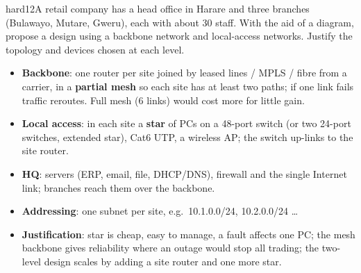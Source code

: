 \documentclass[10pt]{article}
\begin{document}
\begin{practice}{hard}{12}A retail company has a head office in Harare and three branches (Bulawayo, Mutare, Gweru), each with about 30 staff. With the aid of a diagram, propose a design using a backbone network and local-access networks. Justify the topology and devices chosen at each level.
\sol
\begin{center}
\end{center}
\begin{itemize}
\item \textbf{Backbone}: one router per site joined by leased lines / MPLS / fibre from a carrier, in a \textbf{partial mesh} so each site has at least two paths; if one link fails traffic reroutes. Full mesh (6 links) would cost more for little gain.
\item \textbf{Local access}: in each site a \textbf{star} of PCs on a 48-port switch (or two 24-port switches, extended star), Cat6 UTP, a wireless AP; the switch up-links to the site router.
\item \textbf{HQ}: servers (ERP, email, file, DHCP/DNS), firewall and the single Internet link; branches reach them over the backbone.
\item \textbf{Addressing}: one subnet per site, e.g.\ 10.1.0.0/24, 10.2.0.0/24 \dots
\item \textbf{Justification}: star is cheap, easy to manage, a fault affects one PC; the mesh backbone gives reliability where an outage would stop all trading; the two-level design scales by adding a site router and one more star.
\end{itemize}
\end{practice}
\end{document}
